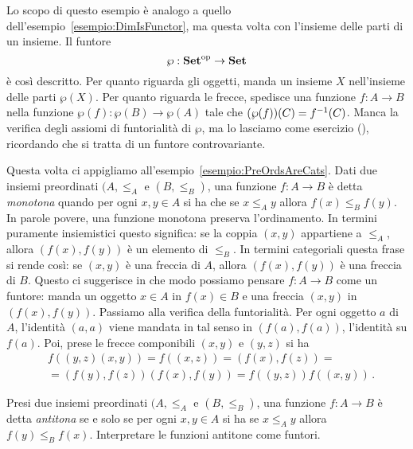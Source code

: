 \begin{esempio}
Lo scopo di questo esempio è analogo a quello dell'esempio~\ref{esempio:DimIsFunctor}, ma questa volta con l'insieme delle parti di un insieme. Il funtore
\[\wp : \mathbf{Set}^\text{op} \to \mathbf{Set}\]
è così descritto. Per quanto riguarda gli oggetti, manda un insieme \(X\) nell'insieme delle parti \(\wp(X)\). Per quanto riguarda le frecce, spedisce una funzione \(f : A \to B\) nella funzione \(\wp(f) : \wp(B) \to \wp(A)\) tale che \((\wp(f))(C) = f^{-1}(C)\). Manca la verifica degli assiomi di funtorialità di \(\wp\), ma lo lasciamo come esercizio (\perlettore), ricordando che si tratta di un funtore controvariante.
\end{esempio}

\begin{esempio}
Questa volta ci appigliamo all'esempio~\ref{esempio:PreOrdsAreCats}. Dati due insiemi preordinati \((A, \leqslant_A\) e \((B, \leqslant_B)\), una funzione \(f : A \to B\) è detta {\em monotona} quando per ogni \(x, y \in A\) si ha che se \(x \leqslant_A y\) allora \(f(x) \leqslant_B f(y)\). In parole povere, una funzione monotona preserva l'ordinamento. In termini puramente insiemistici questo significa: se la coppia \((x, y)\) appartiene a \(\leqslant_A\), allora \((f(x), f(y))\) è un elemento di \(\leqslant_B\). In termini categoriali questa frase si rende così: se \((x, y)\) è una freccia di \(A\), allora \((f(x), f(y))\) è una freccia di \(B\). Questo ci suggerisce in che modo possiamo pensare \(f : A \to B\) come un funtore: manda un oggetto \(x \in A\) in \(f(x) \in B\) e una freccia \((x, y)\) in \((f(x), f(y))\).%
Passiamo alla verifica della funtorialità. Per ogni oggetto \(a\) di \(A\), l'identità \((a, a)\) viene mandata in tal senso in \((f(a), f(a))\), l'identità su \(f(a)\). Poi, prese le frecce componibili \((x, y)\) e \((y, z)\) si ha
\begin{align*}
&f((y, z)(x, y)) = f((x, z)) = (f(x), f(z)) = \\
&= (f(y), f(z)) (f(x), f(y)) = f((y, z)) f((x, y))\,.
\end{align*}
\end{esempio}

\begin{esercizio}
Presi due insiemi preordinati \((A, \leqslant_A\) e \((B, \leqslant_B)\), una funzione \(f : A \to B\) è detta {\em antitona} se e solo se per ogni \(x, y \in A\) si ha se \(x \leqslant_A y\) allora \(f(y) \leqslant_B f(x)\). Interpretare le funzioni antitone come funtori.
\end{esercizio}


